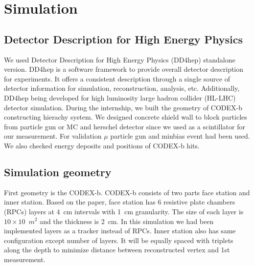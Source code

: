 \section{Simulation}
\label{sec:Simulation}

\subsection{Detector Description for High Energy Physics}
We used Detector Description for High Energy Physics (DD4hep) standalone version.
DD4hep is a software framework to provide overall detector description for experiments.
It offers a consistent description through a single source of detector information for simulation, reconstruction, analysis, etc.
Additionally, DD4hep being developed for high luminosity large hadron collider (HL-LHC) detector simulation.
During the internship, we built the geometry of CODEX-b constructing hierachy system.
We designed concrete shield wall to block particles from particle gun or MC and herschel detector since we used as a scintillator for our measurement.
For validation $\mu$ particle gun and minbias event had been used.
We also checked energy deposits and positions of CODEX-b hits. 


\subsection{Simulation geometry}
First geometry is the CODEX-b.
CODEX-b consists of two parts face station and inner station.
Based on the paper, face station has 6 resistive plate chambers (RPCs) layers at 4~cm intervals with 1~cm granularity.
The size of each layer is $10 \times 10$~$m^{2}$ and the thickness is 2~cm. 
In this simulation we had been implemented layers as a tracker instead of RPCs.
Inner station also has same configuration except number of layers.
It will be equally spaced with triplets along the depth to minimize distance between reconstructed vertex and 1st measurement. 

